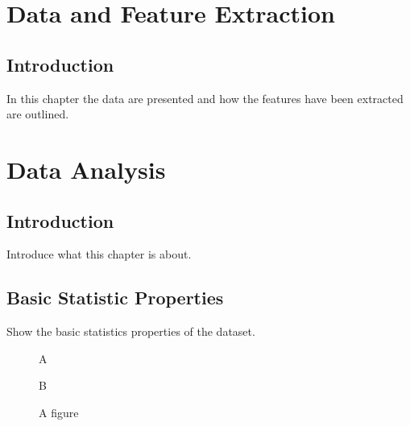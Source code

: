 \documentclass[10pt,a4paper]{report}
\newcommand{\texdir}{tex/} %
\begin{document}
\inserttitlepage

\inserttoc



\chapter{Data and Feature Extraction}

\section{Introduction}
In this chapter the data are presented and how the features have been extracted are outlined.

 

\chapter{Data Analysis}

\section{Introduction}
Introduce what this chapter is about.


\section{Basic Statistic Properties}
Show the basic statistics properties of the dataset.
\begin{figure}[hbtp]
\begin{minipage}[b]{.45\linewidth}
\centering\large A
\label{fig:1a}
\end{minipage}%
\hfill
\begin{minipage}[b]{.45\linewidth}
\centering\large B

\label{fig:1b}
\end{minipage}
\caption{A figure}\label{fig:1}
\end{figure}
\end{document}
